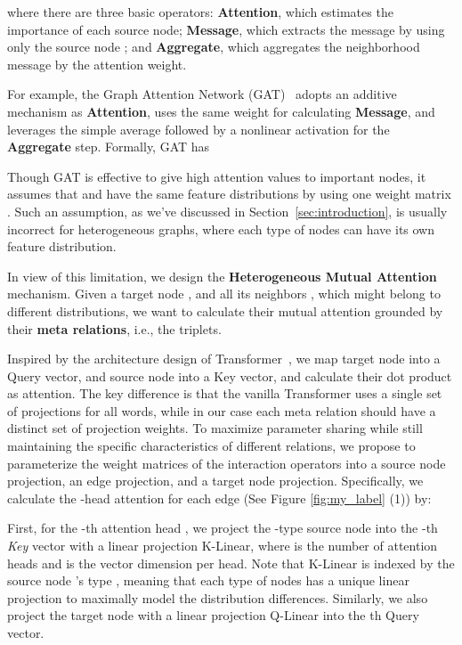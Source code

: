\documentclass[sigconf]{acmart}
\theoremstyle{definition}
\begin{document}
where there are three basic operators: \textbf{Attention}, which estimates the importance of each source node; \textbf{Message}, which extracts the message by using only the source node ; and \textbf{Aggregate}, which aggregates the neighborhood message by the attention weight. 



For example, the Graph Attention Network (GAT)~\cite{gat} adopts an additive mechanism as \textbf{Attention}, uses the same weight for calculating \textbf{Message}, and leverages the simple average followed by a nonlinear activation for the \textbf{Aggregate} step. 
Formally, GAT has

Though GAT is effective to give high attention values to important nodes, it assumes that  and  have the same feature distributions by using one weight matrix . 
Such an assumption, as we've discussed in Section~\ref{sec:introduction}, 
is usually incorrect for heterogeneous graphs, where each type of nodes can have its own feature distribution. 


In view of this limitation, we design the \textbf{Heterogeneous Mutual Attention} mechanism. 
Given a target node , and all its neighbors , which might belong to different distributions, we want to calculate their mutual attention grounded by their \textbf{meta relations}, i.e., the  triplets. 

Inspired by the architecture design of Transformer~\cite{DBLP:conf/nips/VaswaniSPUJGKP17}, we  map target node  into a Query vector, and source node  into a Key vector, and calculate their dot product as attention. The key difference is that the vanilla Transformer uses a single set of projections for all words, while in our case each meta relation should have a distinct set of projection weights. To maximize parameter sharing while still maintaining the specific characteristics of different relations, we propose to parameterize the weight matrices of the interaction operators into a source node projection, an edge projection, and a target node projection. Specifically, we calculate the -head {attention} for each edge  (See Figure \ref{fig:my_label} (1)) by:

First, for the -th attention head , we project the -type source node  into the -th \textit{Key} vector  with a linear projection K-Linear, where  is the number of attention heads and  is the vector dimension per head. 
Note that K-Linear is indexed by the source node 's type , meaning that each type of nodes has a unique linear projection to maximally model the distribution differences. 
Similarly, we also project the target node  with a linear projection Q-Linear into the th Query vector. 
\end{document}
